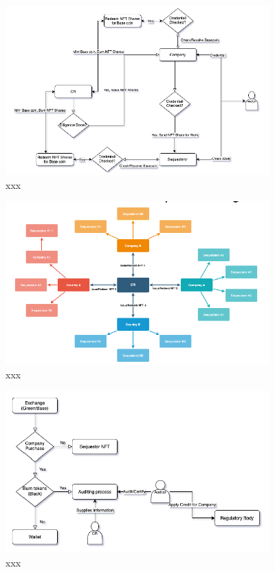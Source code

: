 \documentclass{article}
\begin{document}
\begin{figure}
\centering
\includegraphics[width=4in]{issue_redeem_green.png}
\caption{xxx} 
\label{fig:issue_redeem_green}
\end{figure} 

\begin{figure}
\centering
\includegraphics[width=4in]{red_green.png}
\caption{xxx} 
\label{fig:red_green}
\end{figure} 

\begin{figure}
\centering
\includegraphics[width=4in]{green_black.png}
\caption{xxx} 
\label{fig:green_black}
\end{figure} 
\end{document}
